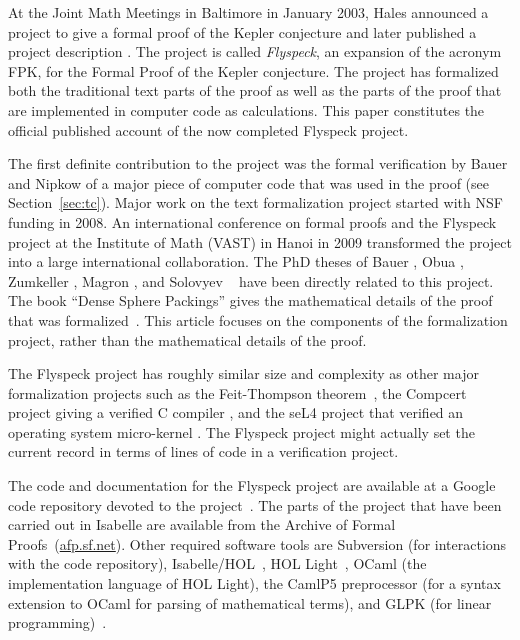 At the Joint Math Meetings in Baltimore in January 2003, Hales announced a
project to give a formal proof of the Kepler conjecture and later
published a project description \cite{hales:DSP:2006:432}.
The project is called {\it Flyspeck}, an expansion of the acronym
FPK, for the Formal Proof of the Kepler conjecture.  The project has
formalized both the traditional text parts of the proof as well as the
parts of the proof that are implemented in computer code as
calculations.  This paper constitutes the official published account
of the now completed Flyspeck project.

The first definite contribution to the project was the formal
verification by Bauer and Nipkow of a major piece of computer code
that was used in the proof (see Section~\ref{sec:tc}).  Major work on
the text formalization project started with NSF funding in 2008.  An
international conference on formal proofs and the Flyspeck project
at the Institute of Math (VAST) in Hanoi in 2009 transformed the project
into a large international collaboration.  The PhD theses of Bauer
\cite{Bauer:2006:Thesis}, Obua \cite{Obua:2005:Thesis}, Zumkeller
\cite{Zumkeller:2008:Thesis}, Magron \cite{Magron:3013:Thesis}, and
Solovyev ~\cite{Solovyev-thesis} have been directly related to this
project.  The book ``Dense Sphere Packings'' gives the mathematical
details of the proof that was formalized~\cite{DSP}.  This article
focuses on the components of the formalization project, rather than
the mathematical details of the proof.

The Flyspeck project has roughly similar size and complexity as other
major formalization projects such as the Feit-Thompson
theorem~\cite{gonthier2013machine}, the Compcert project giving a
verified C compiler \cite{CC}, and the seL4 project that verified an
operating system micro-kernel \cite{Klein-SOSP09}.  The Flyspeck
project might actually set the current record in terms of lines of
code in a verification project.  


The code and documentation for the Flyspeck project are available at a
Google code repository devoted to the
project~\cite{website:FlyspeckProject}.  The parts of the project that
have been carried out in Isabelle are available from the Archive of
Formal Proofs~(\url{afp.sf.net}).  Other required software tools are
Subversion (for interactions with the code repository),
Isabelle/HOL~\cite{LNCS2283}, HOL Light~\cite{HOLL}, OCaml (the
implementation language of HOL Light), the CamlP5 preprocessor (for a
syntax extension to OCaml for parsing of mathematical terms), and GLPK
(for linear programming)~\cite{website:GLPK}.

